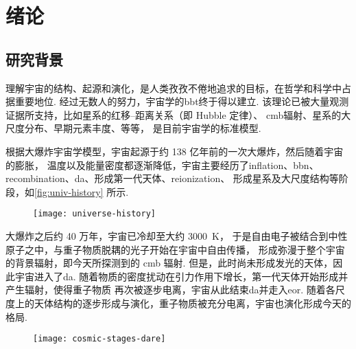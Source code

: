 
\chapter{绪论}
\label{chap:introduction}

\section{研究背景}

理解宇宙的结构、起源和演化，是人类孜孜不倦地追求的目标，在哲学和科学中占据重要地位.
经过无数人的努力，宇宙学的\ac{bbt}终于得以建立.
该理论已被大量观测证据所支持，比如星系的红移--距离关系（即 Hubble 定律）、
\ac{cmb}辐射、星系的大尺度分布、早期元素丰度、等等，
是目前宇宙学的标准模型.

根据大爆炸宇宙学模型，宇宙起源于约 138 亿年前的一次大爆炸，然后随着宇宙的膨胀，
温度以及能量密度都逐渐降低，宇宙主要经历了\ac{inflation}、\ac{bbn}、
\ac{recombination}、\ac{da}、形成第一代天体、\ac{reionization}、
形成星系及大尺度结构等阶段，如\autoref{fig:univ-history} 所示.

\begin{figure}[htp]
  \centering
  \texttt{[image: universe-history]}
  \label{fig:univ-history}
\end{figure}

大爆炸之后约 40 万年，宇宙已冷却至大约 \SI{3000}{\kelvin}，
于是自由电子被结合到中性原子之中，与重子物质脱耦的光子开始在宇宙中自由传播，
形成弥漫于整个宇宙的背景辐射，即今天所探测到的 \ac{cmb} 辐射.
但是，此时尚未形成发光的天体，因此宇宙进入了\ac{da}.
随着物质的密度扰动在引力作用下增长，第一代天体开始形成并产生辐射，使得重子物质
再次被逐步电离，宇宙从此结束\ac{da}并走入\ac{eor}.
随着各尺度上的天体结构的逐步形成与演化，重子物质被充分电离，宇宙也演化形成今天的格局.

\begin{figure}[htp]
  \centering
  \texttt{[image: cosmic-stages-dare]}
  \label{fig:cosmic-stages}
\end{figure}

